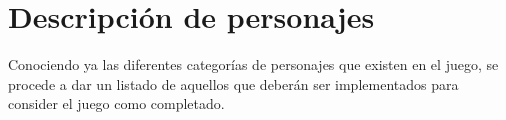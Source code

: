 \section{Descripción de personajes} %


Conociendo ya las diferentes categorías de personajes que existen en el juego,
se procede a dar un listado de aquellos que deberán ser implementados para
consider el juego como completado.






